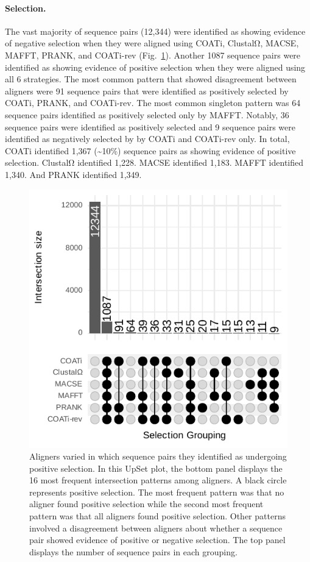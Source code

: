 \documentclass[12pt,letterpaper]{article}
\begin{document}
\paragraph{Selection.}

The vast majority of sequence pairs (12,344) were identified as showing evidence of negative selection when they were aligned using COATi, ClustalΩ, MACSE, MAFFT, PRANK, and COATi-rev (Fig.~\ref{fig:sel-empirical}). Another 1087 sequence pairs were identified as showing evidence of positive selection when they were aligned using all 6 strategies. The most common pattern that showed disagreement between aligners were 91 sequence pairs that were identified as positively selected by COATi, PRANK, and COATi-rev. The most common singleton pattern was 64 sequence pairs identified as positively selected only by MAFFT. Notably, 36 sequence pairs were identified as positively selected and 9 sequence pairs were identified as negatively selected by by COATi and COATi-rev only.
%
In total, COATi identified 1,367 (\sim{}10\%) sequence pairs as showing evidence of positive selection. ClustalΩ identified 1,228. MACSE identified 1,183. MAFFT identified 1,340. And PRANK identified 1,349.

\begin{figure}[h!]
    \centering%
    \includegraphics{figures/fig-sel-empirical.pdf}
    \par
    \caption{Aligners varied in which sequence pairs they identified as undergoing positive selection.
    In this UpSet plot, the bottom panel displays the 16 most frequent intersection patterns among aligners. A black circle represents positive selection. The most frequent pattern was that no aligner found positive selection while the second most frequent pattern was that all aligners found positive selection. Other patterns involved a disagreement between aligners about whether a sequence pair showed evidence of positive or negative selection. The top panel displays the number of sequence pairs in each grouping.
%
    \label{fig:sel-empirical}}
\end{figure}
\end{document}
